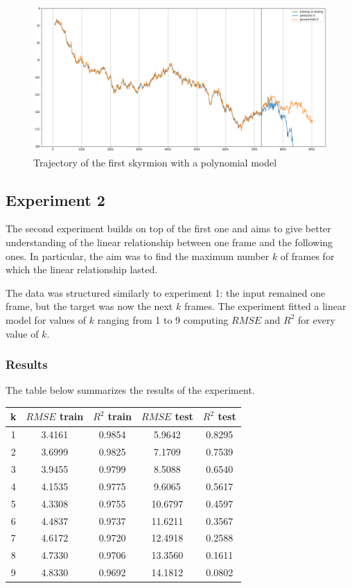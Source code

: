 \documentclass[a4paper]{article}
\begin{document}
  \begin{figure}
    \centering
    \includegraphics[width=\textwidth]{regression1_poly}
    \caption{Trajectory of the first skyrmion with a polynomial model}
    \label{fig:regression1_poly}
  \end{figure}

  \subsection{Experiment 2}
  The second experiment builds on top of the first one and aims to give better understanding of the linear relationship between one frame and the following ones. In particular, the aim was to find the maximum number $k$ of frames for which the linear relationship lasted.

  The data was structured similarly to experiment 1: the input remained one frame, but the target was now the next $k$ frames. The experiment fitted a linear model for values of $k$ ranging from 1 to 9 computing $RMSE$ and $R^2$ for every value of $k$.

  \subsubsection{Results}
  The table below summarizes the results of the experiment.

  \begin{center}
    \begin{tabular}{ |c|c|c|c|c| } 
     \hline
     k & $RMSE$ train & $R^2$ train & $RMSE$ test & $R^2$ test \\
     \hline\hline
     1 & 3.4161 & 0.9854 & 5.9642 & 0.8295 \\
     2 & 3.6999 & 0.9825 & 7.1709 & 0.7539 \\
     3 & 3.9455 & 0.9799 & 8.5088 & 0.6540 \\
     4 & 4.1535 & 0.9775 & 9.6065 & 0.5617 \\
     5 & 4.3308 & 0.9755 & 10.6797 & 0.4597 \\
     6 & 4.4837 & 0.9737 & 11.6211 & 0.3567 \\
     7 & 4.6172 & 0.9720 & 12.4918 & 0.2588 \\
     8 & 4.7330 & 0.9706 & 13.3560 & 0.1611 \\
     9 & 4.8330 & 0.9692 & 14.1812 & 0.0802 \\
     \hline
    \end{tabular}
  \end{center}
\end{document}
